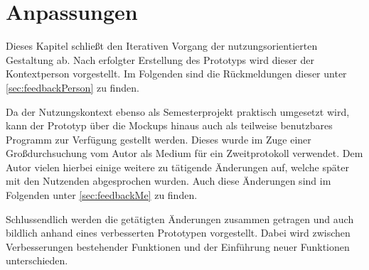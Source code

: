 \chapter{Anpassungen}\label{sec:feedback}

Dieses Kapitel schließt den Iterativen Vorgang der nutzungsorientierten Gestaltung ab.
Nach erfolgter Erstellung des Prototyps wird dieser der Kontextperson vorgestellt.
Im Folgenden sind die Rückmeldungen dieser unter \autoref{sec:feedbackPerson} zu finden.

Da der Nutzungskontext ebenso als Semesterprojekt praktisch umgesetzt wird, kann der Prototyp über die Mockups hinaus auch als teilweise benutzbares Programm zur Verfügung gestellt werden. 
Dieses wurde im Zuge einer Großdurchsuchung vom Autor als Medium für ein Zweitprotokoll verwendet.
Dem Autor vielen hierbei einige weitere zu tätigende Änderungen auf, welche später mit den Nutzenden abgesprochen wurden.
Auch diese Änderungen sind im Folgenden unter \autoref{sec:feedbackMe} zu finden.

Schlussendlich werden die getätigten Änderungen zusammen getragen und auch bildlich anhand eines verbesserten Prototypen vorgestellt.
Dabei wird zwischen Verbesserungen bestehender Funktionen und der Einführung neuer Funktionen unterschieden.